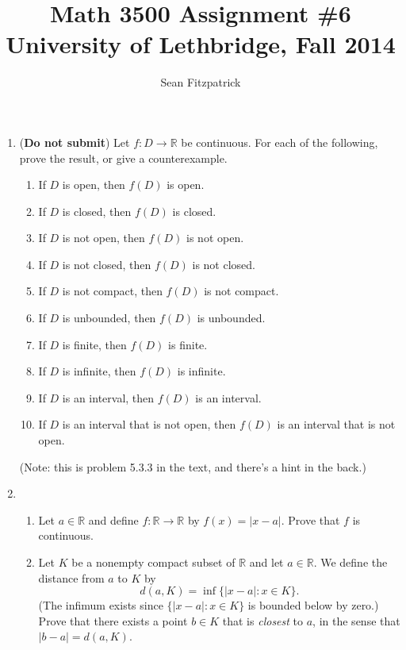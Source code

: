 \documentclass[letterpaper,12pt]{article}
\title{Math 3500 Assignment \#6\\University of Lethbridge, Fall 2014}
\author{Sean Fitzpatrick}
\newcommand{\R}{\mathbb{R}}
\newcommand{\abs}[1]{\lvert #1\rvert}
\begin{document}
 \maketitle


\begin{enumerate}
 \item ({\bf Do not submit}) Let $f:D\to\R$ be continuous. For each of the following, prove the result, or give a counterexample.
\begin{enumerate}
 \item If $D$ is open, then $f(D)$ is open.

 \item If $D$ is closed, then $f(D)$ is closed.

 \item If $D$ is not open, then $f(D)$ is not open.


 \item If $D$ is not closed, then $f(D)$ is not closed.



 \item If $D$ is not compact, then $f(D)$ is not compact.


 \item If $D$ is unbounded, then $f(D)$ is unbounded.


 \item If $D$ is finite, then $f(D)$ is finite.

 \item If $D$ is infinite, then $f(D)$ is infinite.


 \item If $D$ is an interval, then $f(D)$ is an interval.


 \item If $D$ is an interval that is not open, then $f(D)$ is an interval that is not open.



\end{enumerate}
(Note: this is problem 5.3.3 in the text, and there's a hint in the back.)
\item \begin{enumerate}
       \item Let $a\in\R$ and define $f:\R\to\R$ by $f(x)=\abs{x-a}$. Prove that $f$ is continuous.



       \item Let $K$ be a nonempty compact subset of $\R$ and let $a\in\R$. We define the distance from $a$ to $K$ by
\[
 d(a,K) = \inf\{\abs{x-a} : x\in K\}.
\]
(The infimum exists since $\{\abs{x-a} : x\in K\}$ is bounded below by zero.) Prove that there exists a point $b\in K$ that is {\em closest} to $a$, in the sense that $\abs{b-a} = d(a,K)$.
      \end{enumerate}


\end{enumerate}
\end{document}
